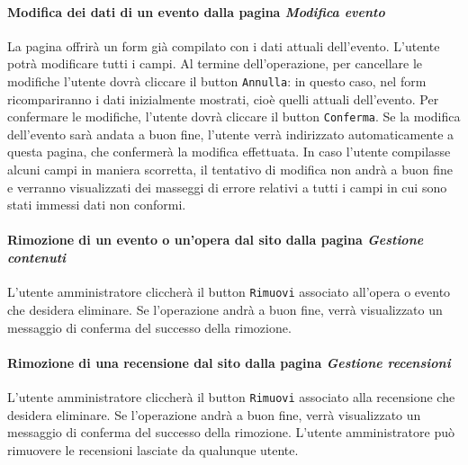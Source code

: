 \paragraph{Modifica dei dati di un evento dalla pagina \textit{Modifica evento}}
\label{analisi-casi-uso-attori-principali-utente-amministratore-11}
La pagina offrirà un form già compilato con i dati attuali dell'evento. L'utente potrà modificare tutti i campi. Al termine dell'operazione, per cancellare le modifiche l'utente dovrà cliccare il button \texttt{Annulla}: in questo caso, nel form ricompariranno i dati inizialmente mostrati, cioè quelli attuali dell'evento. Per confermare le modifiche, l'utente dovrà cliccare il button \texttt{Conferma}. Se la modifica dell'evento sarà andata a buon fine, l'utente verrà indirizzato automaticamente a questa pagina, che confermerà la modifica effettuata. In caso l'utente compilasse alcuni campi in maniera scorretta, il tentativo di modifica non andrà a buon fine e verranno visualizzati dei masseggi di errore relativi a tutti i campi in cui sono stati immessi dati non conformi.
%
%


\paragraph{Rimozione di un evento o un'opera dal sito dalla pagina \textit{Gestione contenuti}}
\label{analisi-casi-uso-attori-principali-utente-amministratore-12}
L'utente amministratore cliccherà il button \texttt{Rimuovi} associato all'opera o evento che desidera eliminare. Se l'operazione andrà a buon fine, verrà visualizzato un messaggio di conferma del successo della rimozione.


\paragraph{Rimozione di una recensione dal sito dalla pagina \textit{Gestione recensioni}}
\label{analisi-casi-uso-attori-principali-utente-amministratore-13}
L'utente amministratore cliccherà il button \texttt{Rimuovi} associato alla recensione che desidera eliminare. Se l'operazione andrà a buon fine, verrà visualizzato un messaggio di conferma del successo della rimozione. L'utente amministratore può rimuovere le recensioni lasciate da qualunque utente.


